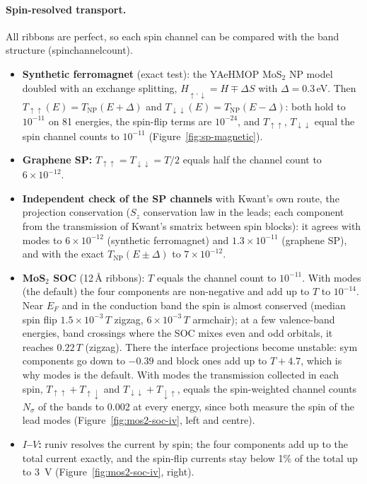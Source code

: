 \documentclass[11pt,a4paper]{article}
\newcommand{\code}[1]{{\ttfamily\def\_{\textunderscore\allowbreak}\def\slash{/\allowbreak}#1}}
\begin{document}
\paragraph{Spin-resolved transport.} All ribbons are perfect, so each spin channel can be
compared with the band structure (\code{spin\_channel\_count}).
\begin{itemize}[nosep]
  \item \textbf{Synthetic ferromagnet} (exact test): the YAeHMOP MoS$_2$ NP model doubled
        with an exchange splitting, $H_{\uparrow,\downarrow} = H \mp \Delta S$ with
        $\Delta=0.3$\,eV. Then $T_{\uparrow\uparrow}(E)=T_\text{NP}(E+\Delta)$ and
        $T_{\downarrow\downarrow}(E)=T_\text{NP}(E-\Delta)$: both hold to $10^{-11}$ on 81
        energies, the spin-flip terms are $10^{-24}$, and $T_{\uparrow\uparrow}$,
        $T_{\downarrow\downarrow}$ equal the spin channel counts to $10^{-11}$
        (Figure~\ref{fig:sp-magnetic}).
  \item \textbf{Graphene SP:} $T_{\uparrow\uparrow}=T_{\downarrow\downarrow}=T/2$ equals half
        the channel count to $6\times10^{-12}$.
  \item \textbf{Independent check of the SP channels} with Kwant's own route, the projection
        \code{conservation} ($S_z$ conservation law in the leads; each component from the
        \code{transmission} of Kwant's \code{smatrix} between spin blocks): it agrees with \code{modes} to
        $6\times10^{-12}$ (synthetic ferromagnet) and $1.3\times10^{-11}$ (graphene SP), and with
        the exact $T_\text{NP}(E\pm\Delta)$ to $7\times10^{-12}$.
  \item \textbf{MoS$_2$ SOC} (12\,\AA{} ribbons): $T$ equals the channel count to $10^{-11}$.
        With \code{modes} (the default) the four components are non-negative and add up to $T$
        to $10^{-14}$. Near $E_F$ and in the conduction band the spin is almost conserved
        (median spin flip $1.5\times10^{-3}\,T$ zigzag, $6\times10^{-3}\,T$ armchair); at a few
        valence-band energies, band crossings where the SOC mixes even and odd orbitals, it
        reaches $0.22\,T$ (zigzag). There the interface projections become unstable: \code{sym}
        components go down to $-0.39$ and \code{block} ones add up to $T+4.7$, which is why
        \code{modes} is the default. With \code{modes} the transmission collected in each spin,
        $T_{\uparrow\uparrow}+T_{\uparrow\downarrow}$ and $T_{\downarrow\downarrow}+T_{\downarrow\uparrow}$, equals the
        spin-weighted channel counts $N_\sigma$ of the bands to 0.002 at every energy, since both
        measure the spin of the lead modes (Figure~\ref{fig:mos2-soc-iv}, left and centre).
  \item \textbf{$I$--$V$:} \code{run\_iv} resolves the current by spin; the four components add
        up to the total current exactly, and the spin-flip currents stay below 1\% of the total
        up to 3~V (Figure~\ref{fig:mos2-soc-iv}, right).
\end{itemize}
\end{document}
